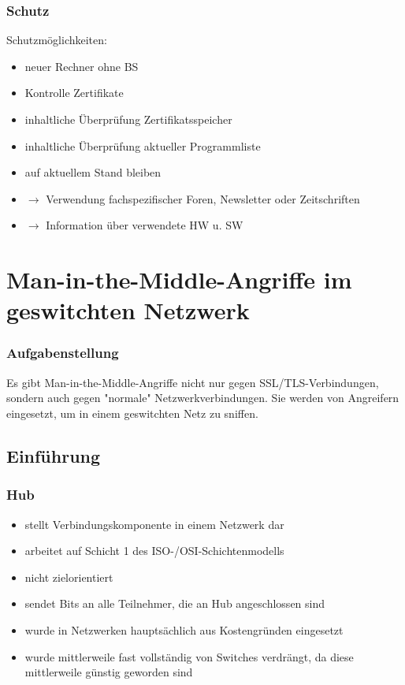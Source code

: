 \documentclass{beamer}
\begin{document}
		\begin{frame}
			\frametitle{Schutz}
			Schutzmöglichkeiten:
			\begin{itemize}
				\item neuer Rechner ohne BS
				\item Kontrolle Zertifikate 
				\item inhaltliche Überprüfung Zertifikatsspeicher
				\item inhaltliche Überprüfung aktueller Programmliste
				\item auf aktuellem Stand bleiben 
				\item[] $\rightarrow$ Verwendung fachspezifischer Foren, Newsletter oder Zeitschriften 
				\item[] $\rightarrow$ Information über verwendete HW u. SW 
			\end{itemize}
		\end{frame}
    
    \section{Man-in-the-Middle-Angriffe im geswitchten Netzwerk}
    	
    	\begin{frame}
    		\frametitle{Aufgabenstellung}
    		Es gibt Man-in-the-Middle-Angriffe nicht nur gegen SSL/TLS-Verbindungen, sondern auch gegen "normale" Netzwerkverbindungen. Sie werden von Angreifern eingesetzt, um in einem geswitchten Netz zu sniffen.
        \end{frame}
        \subsection*{Einführung}
        \begin{frame}
        	\frametitle{Hub}
            \begin{itemize}
            \item stellt Verbindungskomponente in einem Netzwerk dar
            \item arbeitet auf Schicht 1 des ISO-/OSI-Schichtenmodells
            \item nicht zielorientiert
            \item sendet Bits an alle Teilnehmer, die an Hub angeschlossen sind
            \item wurde in Netzwerken hauptsächlich aus Kostengründen eingesetzt
            \item wurde mittlerweile fast vollständig von Switches verdrängt, da diese mittlerweile günstig geworden sind 
            \end{itemize}
        \end{frame}
        
\end{document}
